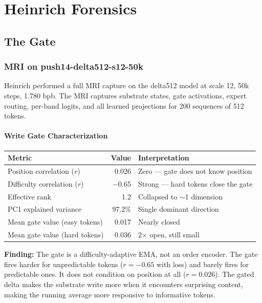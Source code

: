 \documentclass[11pt,a4paper]{report}
\newcommand{\finding}[1]{\textcolor{finding}{\textbf{Finding:}} #1}
\begin{document}
\part{Heinrich Forensics}
\label{part:forensics}

\chapter{The Gate}

\section{MRI on push14-delta512-s12-50k}

Heinrich performed a full MRI capture on the delta512 model at scale 12, 50k steps, 1.780 bpb. The MRI captures substrate states, gate activations, expert routing, per-band logits, and all learned projections for 200 sequences of 512 tokens.

\subsection{Write Gate Characterization}

\begin{center}
\begin{tabular}{lrl}
\toprule
Metric & Value & Interpretation \\
\midrule
Position correlation ($r$) & 0.026 & Zero --- gate does not know position \\
Difficulty correlation ($r$) & $-$0.65 & Strong --- hard tokens close the gate \\
Effective rank & 1.2 & Collapsed to $\sim$1 dimension \\
PC1 explained variance & 97.2\% & Single dominant direction \\
Mean gate value (easy tokens) & 0.017 & Nearly closed \\
Mean gate value (hard tokens) & 0.036 & 2$\times$ open, still small \\
\bottomrule
\end{tabular}
\end{center}

\finding{The gate is a difficulty-adaptive EMA, not an order encoder.} The gate fires harder for unpredictable tokens ($r = -0.65$ with loss) and barely fires for predictable ones. It does not condition on position at all ($r = 0.026$). The gated delta makes the substrate write more when it encounters surprising content, making the running average more responsive to informative tokens.
\end{document}
